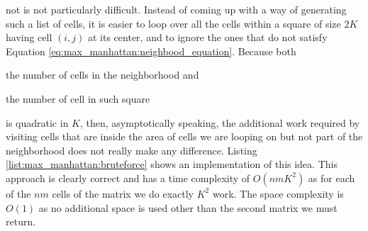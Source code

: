 not is not particularly difficult. Instead of coming up with a way of
generating such a list of cells, it is easier to loop over all the cells within a square of size
$2K$ having cell $(i,j)$ at its center, and to ignore the ones that do not satisfy Equation
\ref{eq:max_manhattan:neighbood_equation}. Because both 
\begin{enumerate*}
    \item the number of cells in the neighborhood and 
    \item the number of cell in such square \end{enumerate*} is quadratic in $K$, then,
asymptotically speaking, the additional work required by visiting cells that are inside the area of
cells we are looping on but not part of the neighborhood does not really make any difference.
Listing \ref{list:max_manhattan:bruteforce} shows an implementation of this idea. This approach is
clearly correct and has a time complexity of $O(nmK^2)$ as for each of the $nm$ cells of the matrix
we do exactly $K^2$ work. The space complexity is $O(1)$ as no additional space is used other than
the second matrix we must return.




